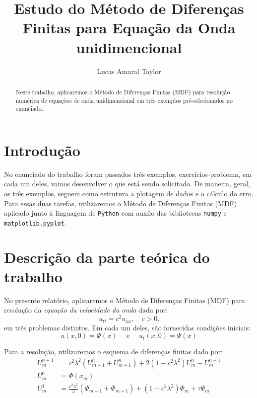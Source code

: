 \documentclass[column,amsmath,amssymb,floatfix]{revtex4}
\begin{document}
\title{Estudo do Método de Diferenças Finitas para Equação da Onda unidimencional}

\author{Lucas Amaral Taylor}

\begin{center}
	\begin{abstract}
		\baselineskip 11pt
		Neste trabalho, aplicaremos o Método de Diferenças Finitas (MDF) para resolução numérica de equações de onda unidimensional em três exemplos pré-selecionados no enunciado.
	\end{abstract}
\end{center}


\maketitle

\section{Introdução} 
No enunciado do trabalho foram passados três exemplos, exercícios-problema, em cada um deles, vamos desenvolver o que está sendo solicitado. De maneira, geral, os três exemplos, seguem como estrutura a plotagem de dados e o cálculo do erro. Para essas duas tarefas, utilizaremos o Método de Diferenças Finitas (MDF) aplicado junto à linguagem de \texttt{Python} com auxílo das bibliotecas \texttt{numpy} e \texttt{matplotlib.pyplot}.

\section{Descrição da parte teórica do trabalho}
No presente relatório, aplicaremos o Método de Diferenças Finitas (MDF) para resolução da \textit{equação da velocidade da onda} dada por:
\begin{equation}
	u_{tt} = c^2 u_{xx}, \quad c>0.
	\label{eq:equacao-da-onda}
\end{equation}
em três problemas distintos. Em cada um deles, são fornecidas condições iniciais:
\begin{equation}
	u(x,0) = \Phi(x) \quad \text{ e } \quad u_t(x, 0) = \Psi(x)
	\label{eq:condicao-inicial-onda}
\end{equation}

Para a resolução, utilizaremos o esquema de diferenças finitas dado por:
\begin{align}
	U_m^{n+1} & = c^2\lambda^2(U_{m-1}^n + U_{m+1}^n) + 2(1-c^2\lambda^2)U_m^n - U_m^{n-1} \label{eq:edf-principal}                  \\
	U_m^0     & = \Phi(x_m) \label{eq:edf-inicial}                                                                                   \\
	U_m^1     & = \frac{c^2\lambda^2}{2}(\Phi_{m-1} + \Phi_{m+1}) + (1-c^2\lambda^2)\Phi_m + \tau\Psi_m \label{eq:edf-passo-inicial} 
\end{align}
\end{document}
